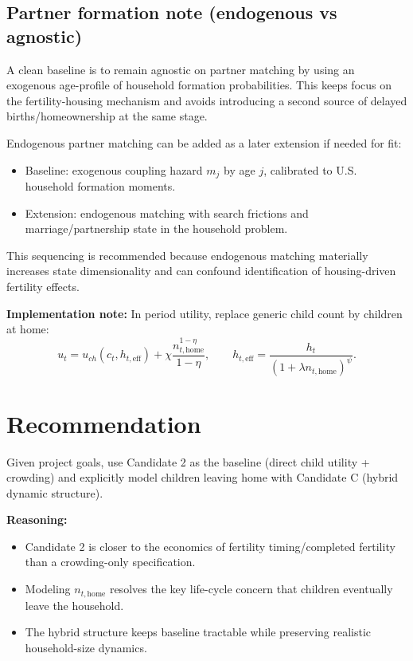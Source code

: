 \documentclass[11pt]{article}
\begin{document}
\subsection*{Partner formation note (endogenous vs agnostic)}
A clean baseline is to remain agnostic on partner matching by using an exogenous age-profile of household formation probabilities. This keeps focus on the fertility-housing mechanism and avoids introducing a second source of delayed births/homeownership at the same stage.

Endogenous partner matching can be added as a later extension if needed for fit:
\begin{itemize}
\item Baseline: exogenous coupling hazard \(m_j\) by age \(j\), calibrated to U.S. household formation moments.
\item Extension: endogenous matching with search frictions and marriage/partnership state in the household problem.
\end{itemize}
This sequencing is recommended because endogenous matching materially increases state dimensionality and can confound identification of housing-driven fertility effects.

\textbf{Implementation note:}
In period utility, replace generic child count by children at home:
\begin{equation}
u_t = u_{ch}(c_t,h_{t,\text{eff}}) + \chi\frac{n_{t,\text{home}}^{1-\eta}}{1-\eta},
\qquad
h_{t,\text{eff}} = \frac{h_t}{(1+\lambda n_{t,\text{home}})^{\psi}}.
\end{equation}

\section{Recommendation}
Given project goals, use Candidate 2 as the baseline (direct child utility + crowding) and explicitly model children leaving home with Candidate C (hybrid dynamic structure).

\textbf{Reasoning:}
\begin{itemize}
\item Candidate 2 is closer to the economics of fertility timing/completed fertility than a crowding-only specification.
\item Modeling \(n_{t,\text{home}}\) resolves the key life-cycle concern that children eventually leave the household.
\item The hybrid structure keeps baseline tractable while preserving realistic household-size dynamics.
\end{itemize}
\end{document}
